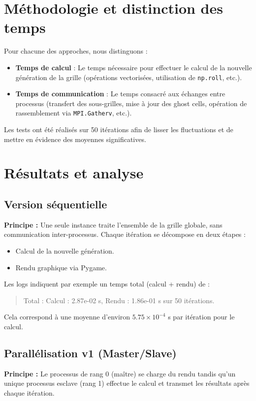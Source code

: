 \documentclass[a4paper,13pt]{book}
\begin{document}
\section{Méthodologie et distinction des temps}
Pour chacune des approches, nous distinguons :
\begin{itemize}
    \item \textbf{Temps de calcul} : Le temps nécessaire pour effectuer le calcul de la nouvelle génération de la grille (opérations vectorisées, utilisation de \texttt{np.roll}, etc.).
    \item \textbf{Temps de communication} : Le temps consacré aux échanges entre processus (transfert des sous-grilles, mise à jour des ghost cells, opération de rassemblement via \texttt{MPI.Gatherv}, etc.).
\end{itemize}
Les tests ont été réalisés sur 50 itérations afin de lisser les fluctuations et de mettre en évidence des moyennes significatives.

\section{Résultats et analyse}

\subsection{Version séquentielle}
\textbf{Principe :} Une seule instance traite l'ensemble de la grille globale, sans communication inter-processus. Chaque itération se décompose en deux étapes :
\begin{itemize}
    \item Calcul de la nouvelle génération.
    \item Rendu graphique via Pygame.
\end{itemize}
Les logs indiquent par exemple un temps total (calcul + rendu) de :
\begin{quote}
Total : Calcul : 2.87e-02 s, Rendu : 1.86e-01 s sur 50 itérations.
\end{quote}
Cela correspond à une moyenne d'environ \(5.75\times10^{-4}\) s par itération pour le calcul.

\subsection{Parallélisation v1 (Master/Slave)}
\textbf{Principe :}  
Le processus de rang 0 (maître) se charge du rendu tandis qu’un unique processus esclave (rang 1) effectue le calcul et transmet les résultats après chaque itération.  
\medskip
\end{document}
